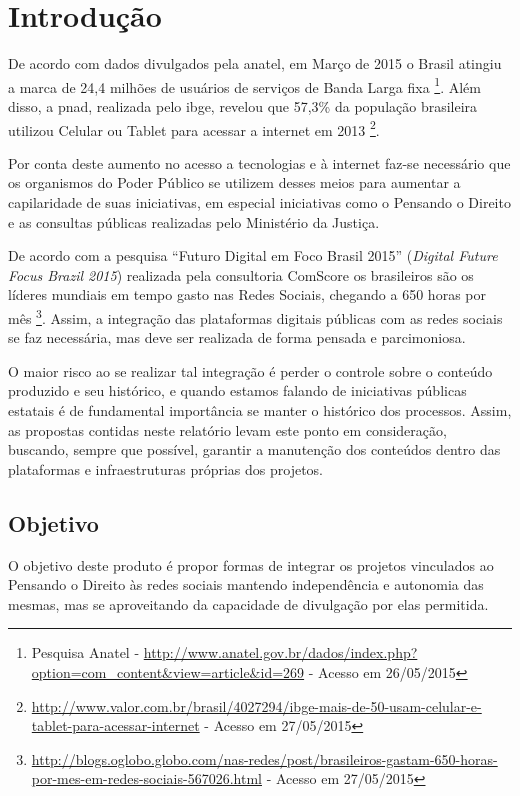 \chapter{Introdução}
De acordo com dados divulgados pela \gls{anatel}, em Março de 2015 o Brasil atingiu a marca de 24,4 milhões de usuários de serviços de Banda Larga fixa%
\footnote{Pesquisa Anatel - \url{http://www.anatel.gov.br/dados/index.php?option=com_content&view=article&id=269} - Acesso em 26/05/2015}.
%
Além disso, a \gls{pnad}, realizada pelo \gls{ibge}, revelou que 57,3\% da população brasileira utilizou Celular ou Tablet para acessar a internet em 2013%
\footnote{\url{http://www.valor.com.br/brasil/4027294/ibge-mais-de-50-usam-celular-e-tablet-para-acessar-internet} - Acesso em 27/05/2015}.

Por conta deste aumento no acesso a tecnologias e à internet faz-se necessário que os organismos do Poder Público se utilizem desses meios para aumentar a capilaridade de suas iniciativas, em especial iniciativas como o Pensando o Direito e as consultas públicas realizadas pelo Ministério da Justiça.

De acordo com a pesquisa ``Futuro Digital em Foco Brasil 2015'' (\textit{Digital Future Focus Brazil 2015}) realizada pela consultoria ComScore os brasileiros são os líderes mundiais em tempo gasto nas Redes Sociais, chegando a 650 horas por mês%
\footnote{\url{http://blogs.oglobo.globo.com/nas-redes/post/brasileiros-gastam-650-horas-por-mes-em-redes-sociais-567026.html} - Acesso em 27/05/2015}. Assim, a integração das plataformas digitais públicas com as redes sociais se faz necessária, mas deve ser realizada de forma pensada e parcimoniosa.

O maior risco ao se realizar tal integração é perder o controle sobre o conteúdo produzido e seu histórico, e quando estamos falando de iniciativas públicas estatais é de fundamental importância se manter o histórico dos processos. Assim, as propostas contidas neste relatório levam este ponto em consideração, buscando, sempre que possível, garantir a manutenção dos conteúdos dentro das plataformas e infraestruturas próprias dos projetos.

\section{Objetivo}
O objetivo deste produto é propor formas de integrar os projetos vinculados ao Pensando o Direito às redes sociais mantendo independência e autonomia das mesmas, mas se aproveitando da capacidade de divulgação por elas permitida.